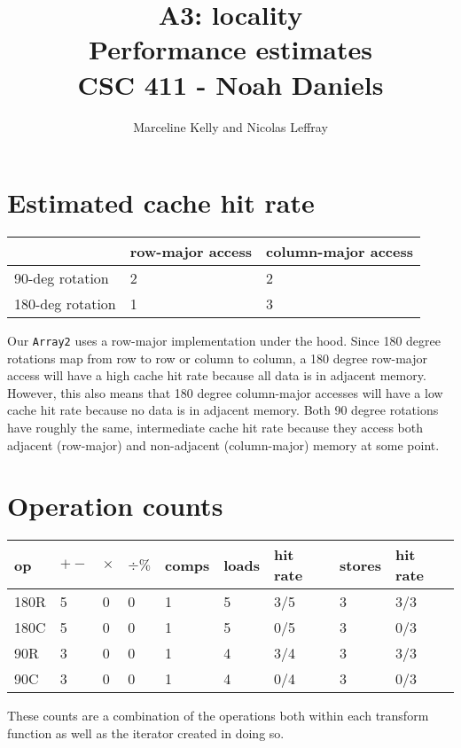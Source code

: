 \documentclass[12pt, letterpaper]{article}
\title{A3: locality \\
    \large Performance estimates \\
    CSC 411 - Noah Daniels}
\author{Marceline Kelly and Nicolas Leffray}
\begin{document}
\maketitle

\section*{Estimated cache hit rate}

\begin{center}
    \begin{tabular}{ l l l }
        \hline
        & row-major access & column-major access \\
        \hline
        90-deg rotation & 2 & 2 \\  
        180-deg rotation & 1 & 3  \\
        \hline
    \end{tabular}
\end{center}
Our \verb|Array2| uses a row-major implementation under the hood.
Since 180 degree rotations map from row to row or column to column, a 180 degree row-major access will have a high cache hit rate because all data is in adjacent memory.
However, this also means that 180 degree column-major accesses will have a low cache hit rate because no data is in adjacent memory.
Both 90 degree rotations have roughly the same, intermediate cache hit rate because they access both adjacent (row-major) and non-adjacent (column-major) memory at some point.

\section*{Operation counts}

\begin{center}
    \begin{tabular}{ l l l l l l l l l }
        \hline
        op & $+-$ & $\times$ & $\div\%$ & comps & loads & hit rate & stores & hit rate \\ 
        \hline
        180R & 5 & 0 & 0 & 1 & 5 & 3/5 & 3 & 3/3 \\
        180C & 5 & 0 & 0 & 1 & 5 & 0/5 & 3 & 0/3 \\
        90R & 3 & 0 & 0 & 1 & 4 & 3/4 & 3 & 3/3 \\
        90C & 3 & 0 & 0 & 1 & 4 & 0/4 & 3 & 0/3 \\
        \hline
    \end{tabular}
\end{center}
These counts are a combination of the operations both within each transform function as well as the iterator created in doing so.
\end{document}
